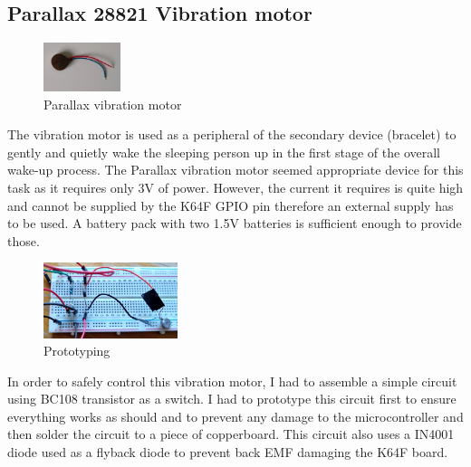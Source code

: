 \documentclass[12pt,a4paper]{article}
\begin{document}
		\subsection{Parallax 28821 Vibration motor}	
		\begin{figure}
			\centering
			\includegraphics[width=0.2\textwidth]{parallax_vib_mot1.jpg}
			\caption{Parallax vibration motor}
		\end{figure}
		
		The vibration motor is used as a peripheral of the secondary device (bracelet) to gently and quietly wake the sleeping person up in the first stage of the overall wake-up process. The Parallax vibration motor seemed appropriate device for this task as it requires only 3V of power. However, the current it requires is quite high and cannot be supplied by the K64F GPIO pin therefore an external supply has to be used. A battery pack with two 1.5V batteries is sufficient enough to provide those. 
		
        \begin{figure}
         \centering
         \includegraphics[width=0.35\textwidth]{circuit_proto.jpg}
         \caption{Prototyping}
        \end{figure}
        
        In order to safely control this vibration motor, I had to assemble a simple circuit using BC108 transistor as a switch. I had to prototype this circuit first to ensure everything works as should and to prevent any damage to the microcontroller and then solder the circuit to a piece of copperboard. This circuit also uses a IN4001 diode used as a flyback diode to prevent back EMF damaging the K64F board.\\
        
\end{document}

